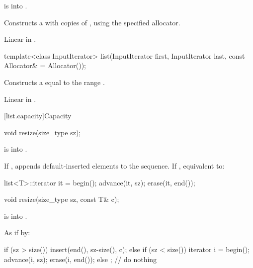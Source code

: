 \begin{itemdescr}
\pnum
\expects
{} is  into .

\pnum
\effects
Constructs a
with
copies of
,
using the specified allocator.

\pnum
\complexity
Linear in
.
\end{itemdescr}

%
\begin{itemdecl}
template<class InputIterator>
  list(InputIterator first, InputIterator last, const Allocator& = Allocator());
\end{itemdecl}

\begin{itemdescr}
\pnum
\effects
Constructs a
equal to the range
.

\pnum
\complexity
Linear in
.
\end{itemdescr}

[list.capacity]{Capacity}

%
\begin{itemdecl}
void resize(size_type sz);
\end{itemdecl}

\begin{itemdescr}
\pnum
\expects
{} is  into .

\pnum
\effects
If ,
appends  default-inserted elements to the
sequence.
If , equivalent to:
\begin{codeblock}
list<T>::iterator it = begin();
advance(it, sz);
erase(it, end());
\end{codeblock}
\end{itemdescr}

%
\begin{itemdecl}
void resize(size_type sz, const T& c);
\end{itemdecl}

\begin{itemdescr}
\pnum
\expects
{} is  into .

\pnum
\effects
As if by:
\begin{codeblock}
if (sz > size())
  insert(end(), sz-size(), c);
else if (sz < size()) {
  iterator i = begin();
  advance(i, sz);
  erase(i, end());
}
else
  ;                 // do nothing
\end{codeblock}
\end{itemdescr}

